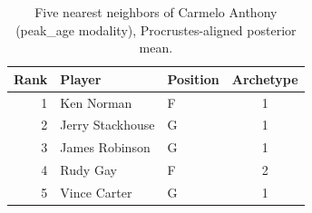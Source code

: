 \begin{table}[htbp]
  \centering\small
  \begin{tabular}{rllc}
    \toprule
    Rank & Player & Position & Archetype \\
    \midrule
    1 & Ken Norman & F & 1 \\
    2 & Jerry Stackhouse & G & 1 \\
    3 & James Robinson & G & 1 \\
    4 & Rudy Gay & F & 2 \\
    5 & Vince Carter & G & 1 \\
    \bottomrule
  \end{tabular}
  \caption{Five nearest neighbors of Carmelo Anthony (peak_age modality), Procrustes-aligned posterior mean.}
  \label{tab:Carmelo_Anthony_neighbors_peak_age}
\end{table}

